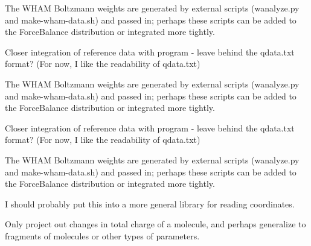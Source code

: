\begin{DoxyRefList}
The W\-H\-A\-M Boltzmann weights are generated by external scripts (wanalyze.\-py and make-\/wham-\/data.\-sh) and passed in; perhaps these scripts can be added to the Force\-Balance distribution or integrated more tightly.

Closer integration of reference data with program -\/ leave behind the qdata.\-txt format? (For now, I like the readability of qdata.\-txt)

The W\-H\-A\-M Boltzmann weights are generated by external scripts (wanalyze.\-py and make-\/wham-\/data.\-sh) and passed in; perhaps these scripts can be added to the Force\-Balance distribution or integrated more tightly.

Closer integration of reference data with program -\/ leave behind the qdata.\-txt format? (For now, I like the readability of qdata.\-txt)

The W\-H\-A\-M Boltzmann weights are generated by external scripts (wanalyze.\-py and make-\/wham-\/data.\-sh) and passed in; perhaps these scripts can be added to the Force\-Balance distribution or integrated more tightly. 
\item[\label{todo__todo000006}%
\hypertarget{todo__todo000006}{}%
Member \hyperlink{classforcebalance_1_1counterpoise_1_1Counterpoise_a8795bd01b0f62b3f612e4e5c762f96f8}{forcebalance.counterpoise.Counterpoise.loadxyz} ]I should probably put this into a more general library for reading coordinates.  
\item[\label{todo__todo000008}%
\hypertarget{todo__todo000008}{}%
Member \hyperlink{classforcebalance_1_1forcefield_1_1FF_acf0ce8fc4e9fbf5257f93d14d4a4f10f}{forcebalance.forcefield.F\-F.mktransmat} ]Only project out changes in total charge of a molecule, and perhaps generalize to fragments of molecules or other types of parameters. 


\end{DoxyRefList}
